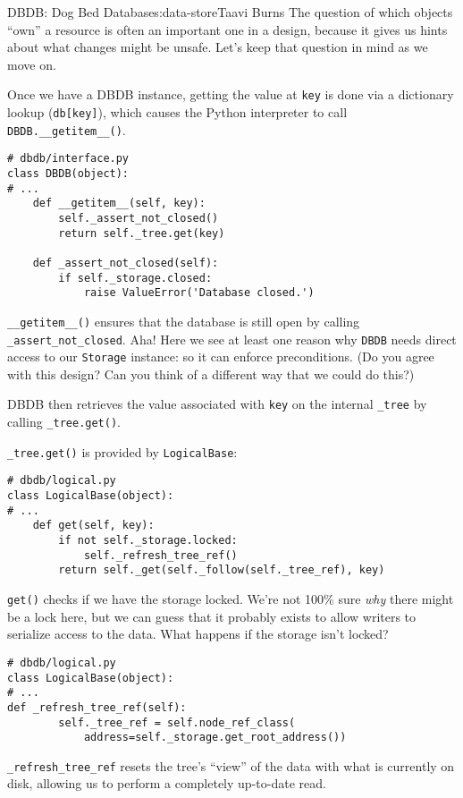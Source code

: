 \begin{aosachapter}{DBDB: Dog Bed Database}{s:data-store}{Taavi Burns}
The question of which objects ``own'' a resource is often an important
one in a design, because it gives us hints about what changes might be
unsafe. Let's keep that question in mind as we move on.

Once we have a DBDB instance, getting the value at \texttt{key} is done
via a dictionary lookup (\texttt{db{[}key{]}}), which causes the Python
interpreter to call \texttt{DBDB.\_\_getitem\_\_()}.

\begin{verbatim}
# dbdb/interface.py
class DBDB(object):
# ...
    def __getitem__(self, key):
        self._assert_not_closed()
        return self._tree.get(key)

    def _assert_not_closed(self):
        if self._storage.closed:
            raise ValueError('Database closed.')
\end{verbatim}

\texttt{\_\_getitem\_\_()} ensures that the database is still open by
calling \texttt{\_assert\_not\_closed}. Aha! Here we see at least one
reason why \texttt{DBDB} needs direct access to our \texttt{Storage}
instance: so it can enforce preconditions. (Do you agree with this
design? Can you think of a different way that we could do this?)

DBDB then retrieves the value associated with \texttt{key} on the
internal \texttt{\_tree} by calling \texttt{\_tree.get()}.

\texttt{\_tree.get()} is provided by \texttt{LogicalBase}:

\begin{verbatim}
# dbdb/logical.py
class LogicalBase(object):
# ...
    def get(self, key):
        if not self._storage.locked:
            self._refresh_tree_ref()
        return self._get(self._follow(self._tree_ref), key)
\end{verbatim}

\texttt{get()} checks if we have the storage locked. We're not 100\%
sure \emph{why} there might be a lock here, but we can guess that it
probably exists to allow writers to serialize access to the data. What
happens if the storage isn't locked?

\begin{verbatim}
# dbdb/logical.py
class LogicalBase(object):
# ...
def _refresh_tree_ref(self):
        self._tree_ref = self.node_ref_class(
            address=self._storage.get_root_address())
\end{verbatim}

\texttt{\_refresh\_tree\_ref} resets the tree's ``view'' of the data
with what is currently on disk, allowing us to perform a completely
up-to-date read.


\end{aosachapter}
